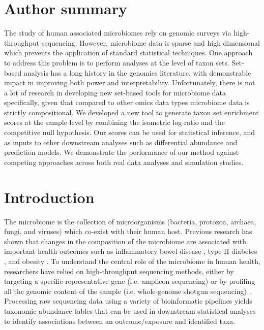 \documentclass[10pt,letterpaper]{article}
\begin{document}
\section*{Author summary}
The study of human associated microbiomes rely on genomic surveys via high-throughput sequencing. However, microbiome data is sparse and high dimensional which prevents the application of standard statistical techniques. One approach to address this problem is to perform analyses at the level of taxon sets. Set-based analysis has a long history in the genomics literature, with demonstrable impact in improving both power and interpretability. Unfortunately, there is not a lot of research in developing new set-based tools for microbiome data specifically, given that compared to other omics data types microbiome data is strictly compositional. We developed a new tool to generate taxon set enrichment scores at the sample level by combining the isometric log-ratio and the competitive null hypothesis. Our scores can be used for statistical inference, and as inputs to other downstream analyses such as differential abundance and prediction models. We demonstrate the performance of our method against competing approaches across both real data analyses and simulation studies. 

\linenumbers

\section*{Introduction}
The microbiome is the collection of microorganisms (bacteria, protozoa, archaea, fungi, and viruses) which co-exist with their human host. Previous research has shown that changes in the composition of the microbiome are associated with important health outcomes such as inflammatory bowel disease \cite{proctor2019}, type II diabetes \cite{sharma2019}, and obesity \cite{aoun2020}. To understand the central role of the microbiome in human health, researchers have relied on high-throughput sequencing methods, either by targeting a specific representative gene (i.e. amplicon sequencing) or by profiling all the genomic content of the sample (i.e. whole-genome shotgun sequencing) \cite{cho2012}. Processing raw sequencing data using a variety of bioinformatic pipelines \cite{callahan2016,truong2015} yields taxonomic abundance tables that can be used in downstream statistical analyses to identify associations between an outcome/exposure and identified taxa.  
\end{document}
